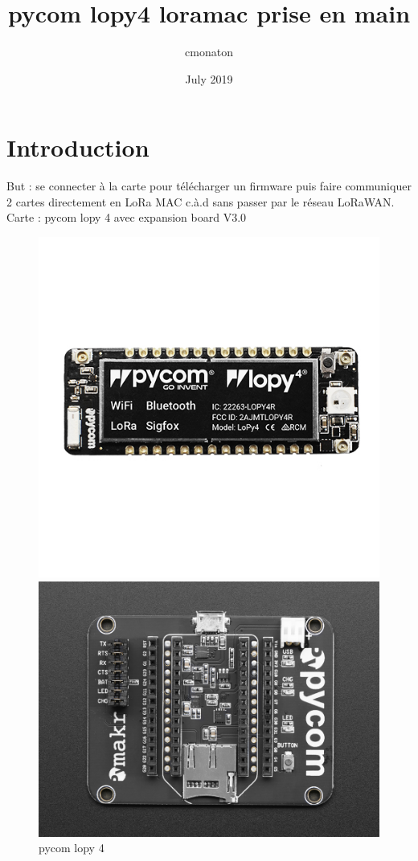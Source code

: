 \documentclass{article}
\title{pycom lopy4 loramac prise en main}
\author{cmonaton }
\date{July 2019}
\begin{document}
\maketitle


\section{Introduction}
But : se connecter à la carte pour télécharger un firmware puis faire communiquer 2 cartes directement en LoRa MAC c.à.d sans passer par le réseau LoRaWAN.\\
Carte : pycom lopy 4 avec expansion board V3.0

\begin{figure}[H]
  \centering
  \begin{minipage}[b]{0.4\textwidth}
    \includegraphics[keepaspectratio=true,scale=1.7]{pycom_lopy4.jpeg}
        \caption{pycom lopy 4}
  \end{minipage}
  \hfill
  \begin{minipage}[b]{0.4\textwidth}
   \includegraphics[keepaspectratio=true,scale=0.5]{pycom_expansion_board.jpeg}

\end{minipage}
\end{figure}
\end{document}
